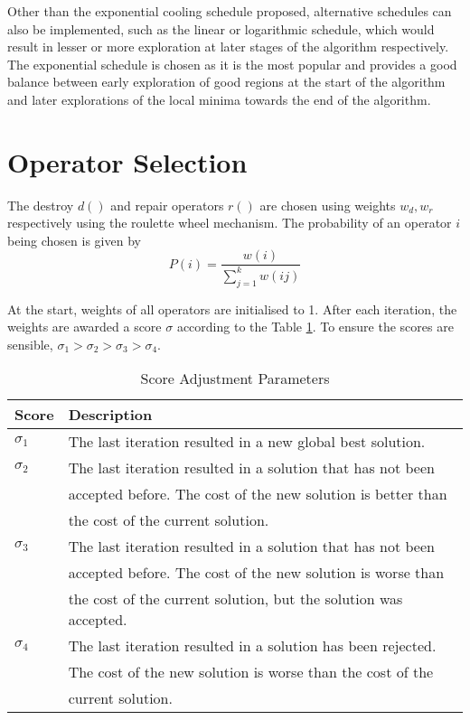 Other than the exponential cooling schedule proposed, alternative schedules can also be implemented, such as the linear or logarithmic schedule, which would result in lesser or more exploration at later stages of the algorithm respectively. The exponential schedule is chosen as it is the most popular and provides a good balance between early exploration of good regions at the start of the algorithm and later explorations of the local minima towards the end of the algorithm.
\section{Operator Selection}
The destroy $d()$ and repair operators $r()$ are chosen using weights $w_{d}, w_{r}$ respectively using the roulette wheel mechanism. The probability of an operator $i$ being chosen is given by
\begin{equation} \label{eq:RW}
P(i) = \frac{w(i)} {\sum_{j=1}^{k} w(ij)}
\end{equation}

At the start, weights of all operators are initialised to 1. After each iteration, the weights are awarded a score $\sigma$ according to the Table \ref{tab:score_adjustment}. To ensure the scores are sensible, $\sigma_1 > \sigma_2 > \sigma_3 > \sigma_4$.

\begin{table}[h]
    \centering
    \begin{tabular}{ll} 
        \toprule
        \textbf{Score} & \textbf{Description} \\ 
        \midrule
        $\sigma_1$ & The last iteration resulted in a new global best solution.\\ 
        
        $\sigma_2$ & The last iteration resulted in a solution that has not been \\ 
                   & accepted before. The cost of the new solution is better than \\ 
                   & the cost of the current solution.\\ 
                   
        $\sigma_3$ & The last iteration resulted in a solution that has not been \\ 
                   & accepted before. The cost of the new solution is worse than \\ 
                   & the cost of the current solution, but the solution was accepted. \\ 
                   
       	$\sigma_4$ & The last iteration resulted in a solution has been rejected.\\ 
                   & The cost of the new solution is worse than the cost of the\\ 
                   & current solution. \\ 
        \bottomrule
    \end{tabular}
    \caption{Score Adjustment Parameters}
    \label{tab:score_adjustment}
\end{table}


